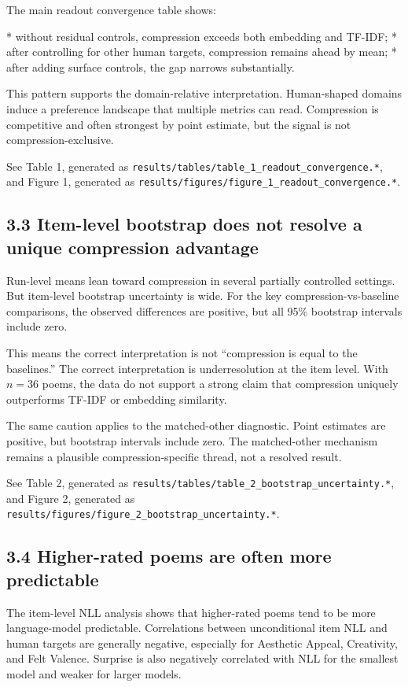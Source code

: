 \documentclass[11pt]{article}
\begin{document}
The main readout convergence table shows:

* without residual controls, compression exceeds both embedding and TF-IDF;
* after controlling for other human targets, compression remains ahead by mean;
* after adding surface controls, the gap narrows substantially.

This pattern supports the domain-relative interpretation. Human-shaped domains induce a preference landscape that multiple metrics can read. Compression is competitive and often strongest by point estimate, but the signal is not compression-exclusive.

See Table 1, generated as \texttt{results/tables/table\_1\_readout\_convergence.*}, and Figure 1, generated as \texttt{results/figures/figure\_1\_readout\_convergence.*}.

\subsection{3.3 Item-level bootstrap does not resolve a unique compression advantage}

Run-level means lean toward compression in several partially controlled settings. But item-level bootstrap uncertainty is wide. For the key compression-vs-baseline comparisons, the observed differences are positive, but all 95\% bootstrap intervals include zero.

This means the correct interpretation is not “compression is equal to the baselines.” The correct interpretation is underresolution at the item level. With \(n=36\) poems, the data do not support a strong claim that compression uniquely outperforms TF-IDF or embedding similarity.

The same caution applies to the matched-other diagnostic. Point estimates are positive, but bootstrap intervals include zero. The matched-other mechanism remains a plausible compression-specific thread, not a resolved result.

See Table 2, generated as \texttt{results/tables/table\_2\_bootstrap\_uncertainty.*}, and Figure 2, generated as \texttt{results/figures/figure\_2\_bootstrap\_uncertainty.*}.

\subsection{3.4 Higher-rated poems are often more predictable}

The item-level NLL analysis shows that higher-rated poems tend to be more language-model predictable. Correlations between unconditional item NLL and human targets are generally negative, especially for Aesthetic Appeal, Creativity, and Felt Valence. Surprise is also negatively correlated with NLL for the smallest model and weaker for larger models.
\end{document}
